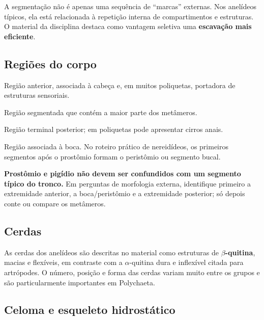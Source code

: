 \documentclass[a4paper,12pt]{article}
\newcommand{\termo}[1]{\textbf{#1}}
\begin{document}
\begin{conceito}
A segmentação não é apenas uma sequência de ``marcas'' externas. Nos anelídeos típicos, ela está relacionada à repetição interna de compartimentos e estruturas. O material da disciplina destaca como vantagem seletiva uma \textbf{escavação mais eficiente}.
\end{conceito}

\subsection{Regiões do corpo}

\begin{description}[style=nextline,leftmargin=1.0cm]
  \item[Prostômio] Região anterior, associada à cabeça e, em muitos poliquetas, portadora de estruturas sensoriais.
  \item[Tronco] Região segmentada que contém a maior parte dos metâmeros.
  \item[Pigídio] Região terminal posterior; em poliquetas pode apresentar cirros anais.
  \item[Peristômio] Região associada à boca. No roteiro prático de nereidídeos, os primeiros segmentos após o prostômio formam o peristômio ou segmento bucal.
\end{description}

\begin{pontoprova}
\textbf{Prostômio e pigídio não devem ser confundidos com um segmento típico do tronco.} Em perguntas de morfologia externa, identifique primeiro a extremidade anterior, a boca/peristômio e a extremidade posterior; só depois conte ou compare os metâmeros.
\end{pontoprova}

\subsection{Cerdas}

As cerdas dos anelídeos são descritas no material como estruturas de \termo{$\beta$-quitina}, macias e flexíveis, em contraste com a $\alpha$-quitina dura e inflexível citada para artrópodes. O número, posição e forma das cerdas variam muito entre os grupos e são particularmente importantes em Polychaeta.

\subsection{Celoma e esqueleto hidrostático}
\end{document}
